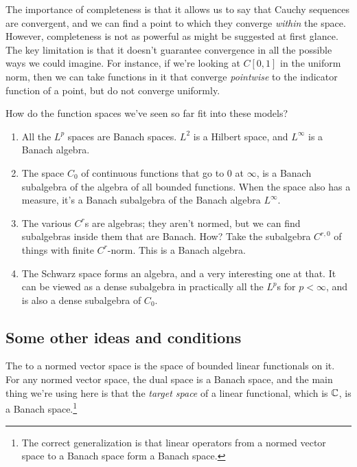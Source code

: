 \documentclass[a4paper]{amsart}
\begin{document}
The importance of completeness is that it allows us to say that Cauchy
sequences are convergent, and we can find a point to which they
converge {\em within} the space. However, completeness is not as
powerful as might be suggested at first glance. The key limitation is
that it doesn't guarantee convergence in all the possible ways we
could imagine. For instance, if we're looking at $C[0,1]$ in the
uniform norm, then we can take functions in it that converge {\em
  pointwise} to the indicator function of a point, but do not converge
uniformly.

How do the function spaces we've seen so far fit into these models?

\begin{enumerate}

\item All the $L^p$ spaces are Banach spaces. $L^2$ is a Hilbert
  space, and $L^\infty$ is a Banach algebra.

\item The space $C_0$ of continuous functions that go to $0$ at
  $\infty$, is a Banach subalgebra of the algebra of all bounded
  functions. When the space also has a measure, it's a Banach
  subalgebra of the Banach algebra $L^\infty$.

\item The various $C^r$s are algebras; they aren't normed, but we can
  find subalgebras inside them that are Banach. How? Take the
  subalgebra $C^{r,0}$ of things with finite $C^r$-norm. This is a
  Banach algebra.

\item The Schwarz space forms an algebra, and a very interesting one
  at that. It can be viewed as a dense subalgebra in practically all
  the $L^p$s for $p < \infty$, and is also a dense subalgebra of
  $C_0$.
\end{enumerate}

\subsection{Some other ideas and conditions}

The  to a normed vector space is the space of
bounded linear functionals on it. For any normed vector space, the
dual space is a Banach space, and the main thing we're using here is
that the {\em target space} of a linear functional, which is $\mathbb{C}$, is
a Banach space.\footnote{The correct generalization is that linear
  operators from a normed vector space to a Banach space form a Banach
  space.}
\end{document}
